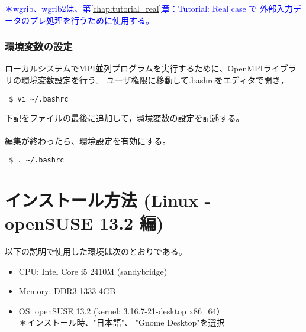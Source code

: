 \noindent \textcolor{blue}{\small ＊wgrib、wgrib2は、第\ref{chap:tutorial_real}章：Tutorial: Real case で
外部入力データのプレ処理を行うために使用する。}


\subsubsection{環境変数の設定}

ローカルシステムでMPI並列プログラムを実行するために、OpenMPIライブラリの環境変数設定を行う。
ユーザ権限に移動して.bashrcをエディタで開き，
\begin{verbatim}
 $ vi ~/.bashrc
\end{verbatim}
下記をファイルの最後に追加して，環境変数の設定を記述する。\\

\\

編集が終わったら、環境設定を有効にする。
\begin{verbatim}
 $ . ~/.bashrc
\end{verbatim}


\section{インストール方法 (Linux - openSUSE 13.2 編)} \label{chap:install_opensuse}

以下の説明で使用した環境は次のとおりである。
\begin{itemize}
\item CPU: Intel Core i5 2410M (sandybridge)
\item Memory: DDR3-1333 4GB
\item OS: openSUSE 13.2 (kernel: 3.16.7-21-desktop x86\_64）\\
{\small ＊インストール時、"日本語"、 "Gnome Desktop"を選択}
\end{itemize}

